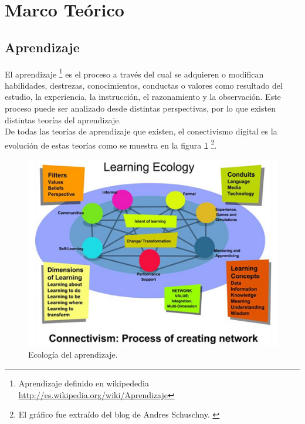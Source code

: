 \section{Marco Te\'orico}

\subsection{Aprendizaje}
El aprendizaje \footnote{Aprendizaje definido en wikipededia \url{http://es.wikipedia.org/wiki/Aprendizaje}} es el proceso a
trav\'es del cual se adquieren o modifican habilidades, destrezas, conocimientos, conductas o valores como resultado del 
estudio, la experiencia, la instrucci\'on, el razonamiento y la observaci\'on. Este proceso puede ser
analizado desde distintas perspectivas, por lo que existen distintas teor\'ias del aprendizaje.\\

De todas las teor\'ias de aprendizaje que existen, el conectivismo digital es la evoluci\'on de estas teor\'ias como se
muestra en la figura \ref{learning} \footnote{El gr\'afico fue extra\'ido del blog de Andres Schuschny. \cite{as}}.

\begin{figure}[h]
\centering
 \includegraphics[scale=0.5]{graphics/learning}
 \caption{Ecolog\'ia del aprendizaje.}
 \label{learning}
\end{figure}



